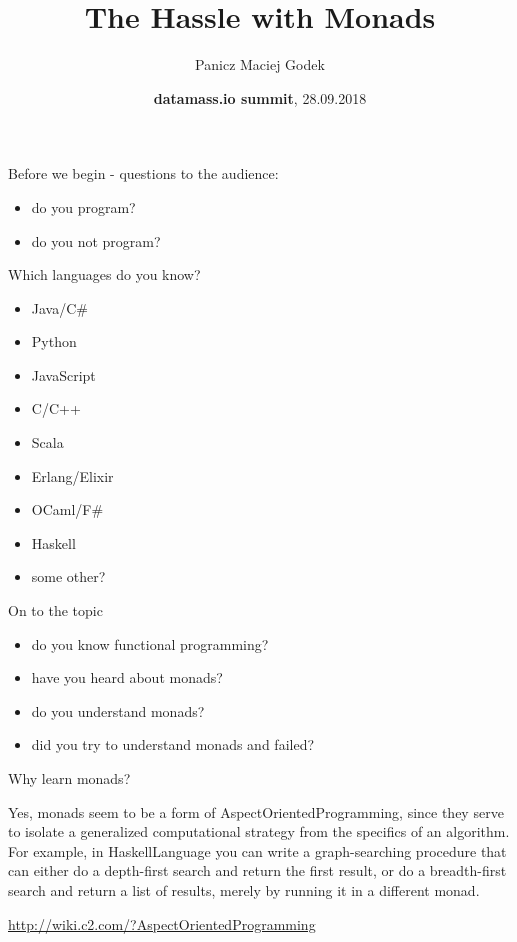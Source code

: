 \documentclass{beamer}
\title{\textbf{The Hassle with Monads}}
\author{Panicz Maciej Godek}
\institute{
  \tiny{\href{mailto:godek.maciek@gmail.com}{\textbf{godek.maciek@gmail.com}}} \\
  \normalsize{\url{https://github.com/panicz/writings/tree/master/talks/datamass}}
}
\date{\textbf{datamass.io summit}, 28.09.2018}
\begin{document}
\begin{frame}
  \titlepage
\end{frame}

\begin{frame}{Before we begin - questions to the audience:}
  \begin{itemize} \pause
  \item do you program? \pause
  \item do you not program?
  \end{itemize}
\end{frame}

\begin{frame}{Which languages do you know?}
  \begin{itemize} \pause
  \item Java/C\# \pause
  \item Python \pause
  \item JavaScript \pause
  \item C/C++ \pause
  \item Scala \pause
  \item Erlang/Elixir \pause
  \item OCaml/F\# \pause
  \item Haskell \pause
  \item some other?
  \end{itemize}
\end{frame}

\begin{frame}{On to the topic}
  \begin{itemize} \pause
  \item do you know functional programming? \pause
  \item have you heard about monads? \pause
  \item do you understand monads? \pause
  \item did you try to understand monads and failed?
  \end{itemize}
\end{frame}


\begin{frame}{Why learn monads?}

  \begin{displayquote}
    Yes, monads seem to be a form of AspectOrientedProgramming,
    since they serve to isolate a generalized computational
    strategy from the specifics of an algorithm. For example,
    in HaskellLanguage you can write a graph-searching
    procedure that can either do a depth-first search
    and return the first result, or do a breadth-first
    search and return a list of results, merely by running
    it in a different monad.
  \end{displayquote}

  \begin{flushright}
    {\footnotesize \url{http://wiki.c2.com/?AspectOrientedProgramming}}
  \end{flushright}
  
\end{frame}
\end{document}
